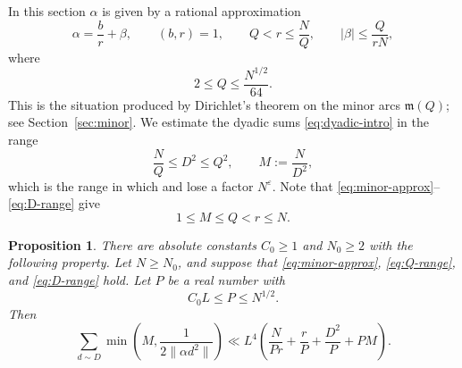 \documentclass[11pt]{amsart}
\numberwithin{equation}{section}
\numberwithin{figure}{section}
\newtheorem{proposition}{Proposition}[section]
\theoremstyle{definition}
\newcommand{\eps}{\varepsilon}
\newcommand{\Minor}{\mathfrak{m}}
\begin{document}
In this section $\alpha$ is given by a rational approximation
\begin{equation}\label{eq:minor-approx}
  \alpha=\frac br+\beta,\qquad (b,r)=1,\qquad Q<r\le\frac NQ,\qquad
  |\beta|\le\frac Q{rN},
\end{equation}
where
\begin{equation}\label{eq:Q-range}
  2\le Q\le\frac{N^{1/2}}{64}.
\end{equation}
This is the situation produced by Dirichlet's theorem on the minor arcs
$\Minor(Q)$; see Section~\ref{sec:minor}.  We estimate the dyadic sums
\eqref{eq:dyadic-intro} in the range
\begin{equation}\label{eq:D-range}
  \frac NQ\le D^2\le Q^2,\qquad M:=\frac N{D^2},
\end{equation}
which is the range in which \cite{BP} and \cite{Tolev} lose a factor
$N^{\eps}$.  Note that \eqref{eq:minor-approx}--\eqref{eq:D-range} give
\begin{equation}\label{eq:M-r}
  1\le M\le Q<r\le N.
\end{equation}

\begin{proposition}\label{prop:sieve}
There are absolute constants $C_0\ge1$ and $N_0\ge2$ with the following
property.  Let $N\ge N_0$, and suppose that \eqref{eq:minor-approx},
\eqref{eq:Q-range}, and \eqref{eq:D-range} hold.  Let $P$ be a real number
with
\begin{equation}\label{eq:P-range}
  C_0L\le P\le N^{1/2}.
\end{equation}
Then
\begin{equation}\label{eq:sieve-bound}
  \sum_{d\sim D}\min\left(M,\frac1{2\|\alpha d^2\|}\right)
  \ll L^4\left(\frac N{Pr}+\frac rP+\frac{D^2}P+PM\right).
\end{equation}
\end{proposition}
\end{document}
